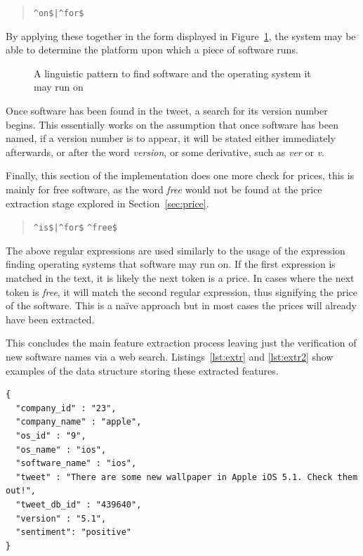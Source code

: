 \begin{quote}
\verb~^on$|^for$~
\end{quote}

By applying these together in the form displayed in Figure~\ref{fig:rule2}, the system may be able to determine the platform upon which a piece of software runs.

\begin{figure}[h!]
 \centering
  
  \caption{A linguistic pattern to find software and the operating system it may run on
    \label{fig:rule2}}
\end{figure}

Once software has been found in the tweet, a search for its version number begins. This essentially works on the assumption that once software has been named, if a version number is to appear, it will be stated either immediately afterwards, or after the word \emph{version}, or some derivative, such as \emph{ver} or \emph{v}.

Finally, this section of the implementation does one more check for prices, this is mainly for free software, as the word \emph{free} would not be found at the price extraction stage explored in Section~\ref{sec:price}. 
\begin{quote}
\verb~^is$|^for$~
\newline
\verb~^free$~
\end{quote}

The above regular expressions are used similarly to the usage of the expression finding operating systems that software may run on. If the first expression is matched in the text, it is likely the next token is a price. In cases where the next token is \emph{free}, it will match the second regular expression, thus signifying the price of the software. This is a na\"{i}ve approach but in most cases the prices will already have been extracted.

This concludes the main feature extraction process leaving just the verification of new software names via a web search. Listings~\ref{lst:extr} and \ref{lst:extr2} show examples of the data structure storing these extracted features.

\begin{lstlisting}[caption=Example of some extracted features, label=lst:extr]
{
  "company_id" : "23",
  "company_name" : "apple",
  "os_id" : "9",
  "os_name" : "ios",
  "software_name" : "ios",
  "tweet" : "There are some new wallpaper in Apple iOS 5.1. Check them out!",
  "tweet_db_id" : "439640",
  "version" : "5.1",
  "sentiment": "positive"
}
\end{lstlisting}

